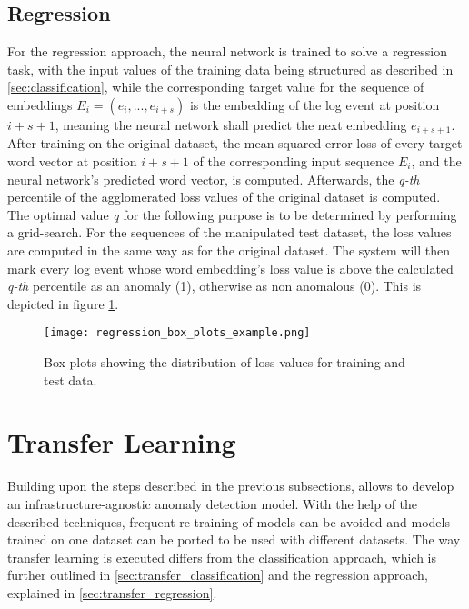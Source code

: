 \subsection{Regression \label{sec:regression}}
For the regression approach, the neural network is trained to solve a regression task, with the input values of the training data being structured as described in \ref{sec:classification}, while the corresponding target value for the sequence of embeddings $E_i = (e_i, ..., e_{i+s})$ is the embedding of the log event at position $i+s+1$, meaning the neural network shall predict the next embedding $e_{i+s+1}$. After training on the original dataset, the mean squared error loss of every target word vector at position $i+s+1$ of the corresponding input sequence $E_i$, and the neural network's predicted word vector, is computed. Afterwards, the \textit{q-th} percentile of the agglomerated loss values of the original dataset is computed. The optimal value \textit{q} for the following purpose is to be determined by performing a grid-search. For the sequences of the manipulated test dataset, the loss values are computed in the same way as for the original dataset. The system will then mark every log event whose word embedding's loss value is above the calculated \textit{q-th} percentile as an anomaly (1), otherwise as non anomalous (0). This is depicted in figure \ref{fig:regression_with_threshold}.

\begin{figure}[htb]
  \centering
  \texttt{[image: regression\_box\_plots\_example.png]} \\
  \caption{Box plots showing the distribution of loss values for training and test data.}
  \label{fig:regression_with_threshold}
\end{figure}


\section{Transfer Learning \label{sec:transferlearning}}
Building upon the steps described in the previous subsections, allows to develop an infrastructure-agnostic anomaly detection model. With the help of the described techniques, frequent re-training of models can be avoided and models trained on one dataset can be ported to be used with different datasets. The way transfer learning is executed differs from the classification approach, which is further outlined in \ref{sec:transfer_classification} and the regression approach, explained in \ref{sec:transfer_regression}. 

